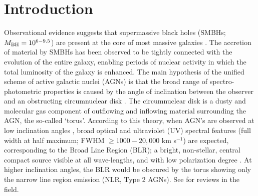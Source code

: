 \documentclass[modern]{CORE-AAS/aastex631}
\begin{document}
\section{Introduction} \label{sec:intro}
Observational evidence suggests that supermassive black holes (SMBHs; $M_{\rm BH}=10^{6-9.5}$) are present at the core of most massive galaxies \citep{kormendy+2013araa51_511}. The accretion of material by SMBHs has been observed to be tightly connected with the evolution of the entire galaxy, enabling periods of nuclear activity in which the total luminosity of the galaxy is enhanced. 
The main hypothesis of the unified scheme of active galactic nuclei (AGNs) is that the broad range of spectro-photometric properties is caused by the angle of inclination between the observer and an obstructing circumnuclear disk \citep{antonucci1993araa31_473, urry+1995pasp107_803}. The circumnuclear disk is a dusty and molecular gas component of outflowing and inflowing material surrounding the AGN, the so-called `torus'. According to this theory, when AGN's are observed at low inclination angles \citep[$i<45$--$60^{\circ}$, where $i=0^{\circ}$ would be face-on,][]{marin2014mnras441_551}, broad optical and ultraviolet (UV) spectral features (full width at half maximum; FWHM $\geq 1000-20,000$ km s$^{-1}$) are expected, corresponding to the Broad Line Region (BLR); a bright, non-stellar, central compact source visible at all wave-lengths, and with low polarization degree \citep[Type 1 AGNs,][]{netzer2015araa53_365}. At higher inclination angles, the BLR would be obscured by the torus showing only the narrow line region emission (NLR, Type 2 AGNs). See \citet{peterson2006incollection_77, netzer2015araa53_365, ramosalmeida+2017nat1_679} for reviews in the field.
\end{document}
